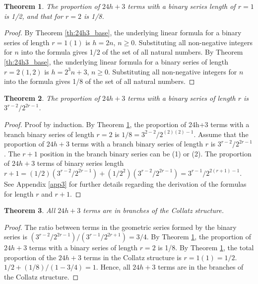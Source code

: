 \documentclass[sn-mathphys-num, pdflatex]{sn-jnl}
\newtheorem{theorem}{Theorem}[section]
\begin{document}
\begin{theorem}\label{th:24h3_prop}
    The proportion of $24h+3$ terms with a binary series length of $r=1$ is 1/2, and that for $r=2$ is 1/8.
\end{theorem}
\begin{proof}
    By Theorem \ref{th:24h3_base}, the underlying linear formula for a binary series of length $r=1 (1)$ is $h=2n$, $n \ge 0$. Substituting all non-negative integers for $n$ into the formula gives 1/2 of the set of all natural numbers.
    By Theorem \ref{th:24h3_base}, the underlying linear formula for a binary series of length $r=2 (1, 2)$ is $h=2^3n+3$, $n \ge 0$. Substituting all non-negative integers for $n$ into the formula gives 1/8 of the set of all natural numbers. 
\end{proof}

\begin{theorem}
    The proportion of $24h+3$ terms with a binary series of length $r$ is $3^{r-2}/2^{2r-1}$.
\end{theorem}

\begin{proof}
    Proof by induction.
    By Theorem \ref{th:24h3_prop}, the proportion of 24h+3 terms with a branch binary series of length $r=2$ is $1/8 = 3^{2-2}/2^{(2)(2)-1}$.
    Assume that the proportion of $24h+3$ terms with a branch binary series of length $r$ is $3^{r-2}/2^{2r-1}$.
    The $r+1$ position in the branch binary series can be (1) or (2).
    The proportion of $24h+3$ terms of binary series length $r+1 = (1/2)(3^{r-2}/2^{2r-1})+(1/2^2)(3^{r-2}/2^{2r-1}) = 3^{r-1}/2^{2(r+1)-1}$.
    See Appendix \ref{app3} for further details regarding the derivation of the formulas for length $r$ and $r+1$.
\end{proof}

\begin{theorem}\label{th:24h3_final}
    All $24h+3$ terms are in branches of the Collatz structure.
\end{theorem}
\begin{proof}
    The ratio between terms in the geometric series formed by the binary series is $(3^{r-2}/2^{2r-1}) / (3^{r-1}/2^{2r+1}) = 3/4$.
    By Theorem \ref{th:24h3_prop}, the proportion of $24h+3$ terms with a binary series of length $r=2$ is 1/8.
    By Theorem \ref{th:24h3_prop}, the total proportion of the $24h+3$ terms in the Collatz structure is $r=1 (1) = 1/2$. $1/2+(1/8)/(1 - 3/4) = 1$.
    Hence, all $24h+3$ terms are in the branches of the Collatz structure.
\end{proof}
\end{document}
